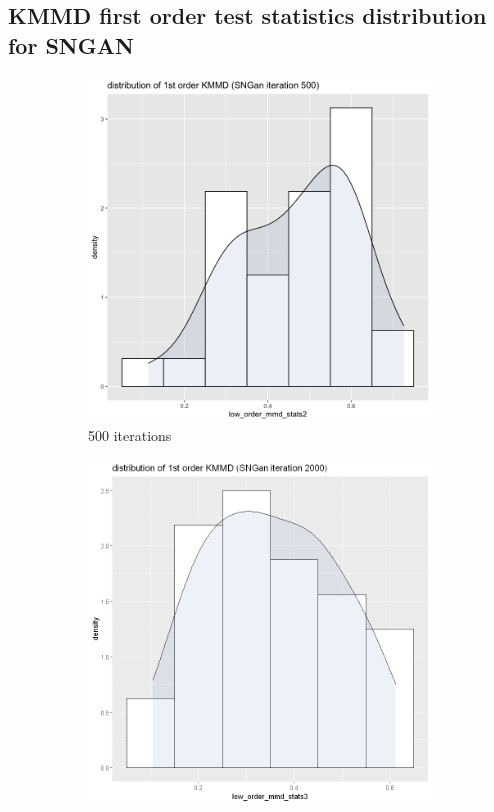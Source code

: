 \documentclass{article}
\begin{document}
\subsection*{KMMD first order test statistics distribution for SNGAN}
\begin{figure}[h!]
    \caption{Dataset Flower}
     \centering
     \begin{subfigure}[b]{0.3\textwidth}
         \centering
         \includegraphics[width=\textwidth]{kmmd_figures/sngan_flower_lowdist_500.png}
         \caption{500 iterations}
     \end{subfigure}
     \hfill
     \begin{subfigure}[b]{0.3\textwidth}
         \centering
         \includegraphics[width=\textwidth]{kmmd_figures/sngan_flower_lowdist_2000.png}

\end{subfigure}
\end{figure}
\end{document}
